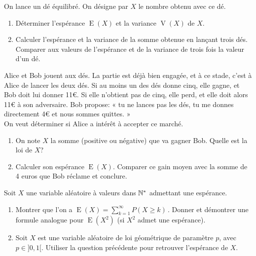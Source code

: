 \documentclass[a4paper,12pt,reqno]{amsart}
\DeclareMathOperator{\E}{E}
\DeclareMathOperator{\V}{V}
\begin{document}


\begin{exo}

  On lance un dé équilibré. On désigne par $X$ le nombre obtenu avec ce dé.

  \begin{enumerate}
    \item Déterminer l'espérance $\E(X)$ et la variance $\V(X)$ de $X$.
    \item Calculer l'espérance et la variance de la somme obtenue en lançant trois dés. Comparer aux valeurs de l'espérance et de la variance de trois fois la valeur d'un dé.
  \end{enumerate}

\end{exo}

\begin{exo}

  Alice et Bob jouent aux dés. La partie est déjà bien engagée, et à ce stade, c'est à Alice de lancer les deux dés. Si au moins un des dés donne cinq, elle gagne, et Bob doit lui donner 11€. Si elle n'obtient pas de cinq, elle perd, et elle doit alors 11€ à son adversaire. Bob propose:
  « tu ne lances pas les dés, tu me donnes directement 4€ et nous sommes quittes. » \\
  On veut déterminer si Alice a intérêt à accepter ce marché.

  \begin{enumerate}
    \item On note $ X $ la somme (positive ou négative) que va gagner Bob. Quelle est la loi de $ X $?
    \item Calculer son espérance $ \E(X) $. Comparer ce gain moyen avec la somme de 4 euros que Bob réclame et conclure.
  \end{enumerate}

\end{exo}

\begin{exo}

  Soit $X$ une variable aléatoire à valeurs dans $\mathbb{N}^*$ admettant une espérance.

  \begin{enumerate}
    \item Montrer que l'on a $\displaystyle \E(X)=\sum_{k=1}^\infty P(X \geq k) \, .$ Donner et démontrer une formule analogue pour $\E(X^2)$ (si $X^2$ admet une espérance).
    \item Soit $X$ est une variable aléatoire de loi géométrique de paramètre $p$, avec $p  \in ]0,1[$. Utiliser la question précédente pour retrouver l'espérance de $X$.
  \end{enumerate}

\end{exo}
\end{document}
